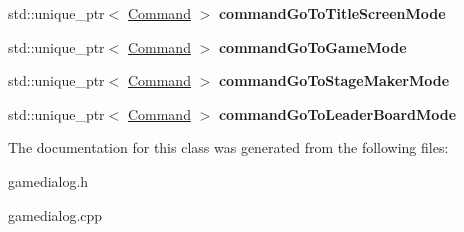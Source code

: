 \begin{DoxyCompactItemize}
std\+::unique\+\_\+ptr$<$ \hyperlink{classgame_1_1Command}{Command} $>$ {\bfseries command\+Go\+To\+Title\+Screen\+Mode}
\item 
\mbox{\label{classgame_1_1GameDialog_aad3827dadd16093327a16240f4ded2e1}} 
std\+::unique\+\_\+ptr$<$ \hyperlink{classgame_1_1Command}{Command} $>$ {\bfseries command\+Go\+To\+Game\+Mode}
\item 
\mbox{\label{classgame_1_1GameDialog_a3baffe837701cda101f8242d1f94d01a}} 
std\+::unique\+\_\+ptr$<$ \hyperlink{classgame_1_1Command}{Command} $>$ {\bfseries command\+Go\+To\+Stage\+Maker\+Mode}
\item 
\mbox{\label{classgame_1_1GameDialog_af909896fedcf53d1b1343d0b262af592}} 
std\+::unique\+\_\+ptr$<$ \hyperlink{classgame_1_1Command}{Command} $>$ {\bfseries command\+Go\+To\+Leader\+Board\+Mode}
\end{DoxyCompactItemize}


The documentation for this class was generated from the following files\+:\begin{DoxyCompactItemize}
\item 
gamedialog.\+h\item 
gamedialog.\+cpp\end{DoxyCompactItemize}
